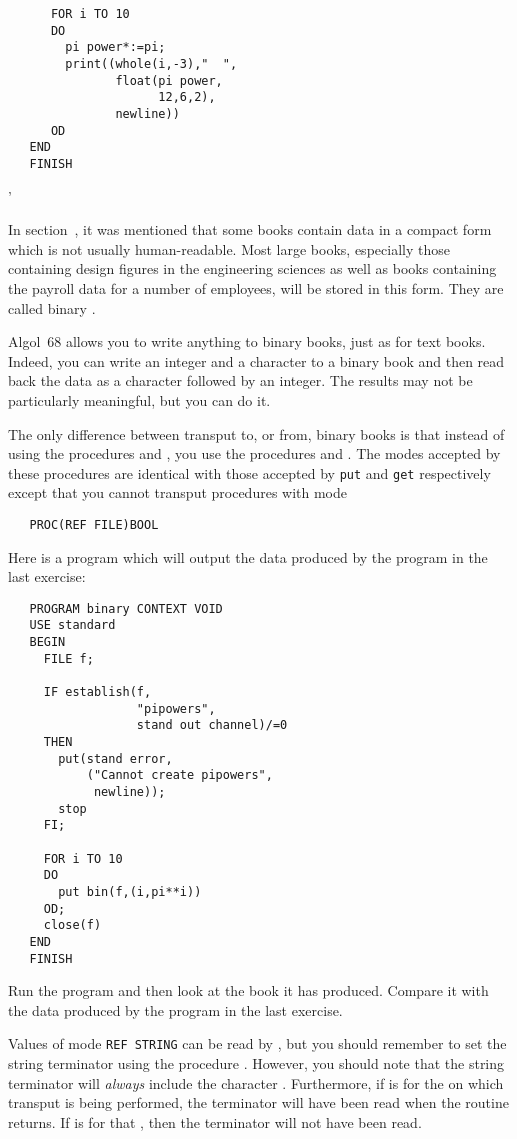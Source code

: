 \begin{exercise}
\begin{verbatim}
      FOR i TO 10
      DO
        pi power*:=pi;
        print((whole(i,-3),"  ",
               float(pi power,
                     12,6,2),
               newline))
      OD
   END
   FINISH
\end{verbatim}
'
\end{exercise}

In section~, it was mentioned that some books
contain data in a compact form which is not usually human-readable.
Most large books, especially those containing design figures in the
engineering sciences as well as books containing the payroll data for
a number of employees, will be stored in this form.  They are called
binary .

Algol~68 allows you to write anything to binary books, just as for
text books. Indeed, you can write an integer and a character to a
binary book and then read back the data as a character followed by an
integer.  The results may not be particularly meaningful, but you can
do it.

The only difference between transput to, or from, binary books is
that instead of using the procedures  and , you
use the procedures  and . The modes
accepted by these procedures are identical with those accepted by
\verb|put| and \verb|get| respectively except that you cannot
transput procedures with mode
\begin{verbatim}
   PROC(REF FILE)BOOL
\end{verbatim}
\noindent
Here is a
program which will output the data produced by the program in the
last exercise:
\begin{verbatim}
   PROGRAM binary CONTEXT VOID
   USE standard
   BEGIN
     FILE f;

     IF establish(f,
                  "pipowers",
                  stand out channel)/=0
     THEN
       put(stand error,
           ("Cannot create pipowers",
            newline));
       stop
     FI;

     FOR i TO 10
     DO
       put bin(f,(i,pi**i))
     OD;
     close(f)
   END
   FINISH
\end{verbatim}
\noindent
Run the program and then look at the book it has produced. Compare it
with the data produced by the program in the last exercise.

Values of mode \verb|REF STRING| can be read by , but
you should remember to set the string terminator using the procedure
. However, you should note that the string terminator
will \textit{always} include the character . Furthermore, if
 is  for the  on which
transput is being performed, the terminator will have been read when
the routine  returns. If  is
 for that , then the terminator will not
have been read.

